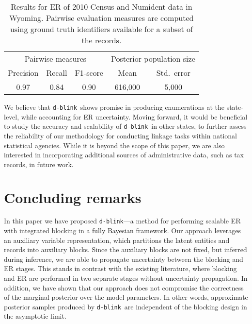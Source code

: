 \documentclass[12pt,letterpaper]{article}
\newcommand{\1}[1]{\mathbb{I}\!\left[#1\right]} %
\newcommand{\dblink}{\texttt{\upshape \lowercase{d-blink}}} %
\begin{document}
\begin{table}
  \centering
  \caption{Results for ER of 2010 Census and Numident data in Wyoming. 
  Pairwise evaluation measures are computed using ground truth identifiers 
  available for a subset of the records.}
  \label{tbl:census-results}
  \footnotesize
  \begin{center}
  \begin{tabular}{*{3}{c} *{2}{c}}
    \toprule
    \multicolumn{3}{c}{Pairwise measures} & \multicolumn{2}{c}{Posterior population size} \\
    \cmidrule(lr){1-3} \cmidrule(lr){4-5}
    Precision & Recall & F1-score &    Mean & Std.~error \\
    \midrule
    0.97 &   0.84 &     0.90 & 616,000 & 5,000 \\
    \bottomrule
  \end{tabular}
  \end{center}
\end{table}

We believe that \dblink\ shows promise in producing enumerations at the 
state-level, while accounting for ER uncertainty.
Moving forward, it would be beneficial to study the accuracy and scalability 
of \dblink\ in other states, to further assess the reliability of our 
methodology for conducting linkage tasks within national statistical 
agencies. 
While it is beyond the scope of this paper, we are also interested in 
incorporating additional sources of administrative data, such as tax records, 
in future work.

\section{Concluding remarks}
\label{sec:conclusions}
In this paper we have proposed \dblink---a method for performing scalable 
ER with integrated blocking in a fully Bayesian framework. 
Our approach leverages an auxiliary variable representation, which 
partitions the latent entities and records into auxiliary blocks. 
Since the auxiliary blocks are not fixed, but inferred during inference, 
we are able to propagate uncertainty between the blocking and ER stages. 
This stands in contrast with the existing literature, where blocking 
and ER are performed in two separate stages without uncertainty 
propagation. 
In addition, we have shown that our approach does not compromise 
the correctness of the marginal posterior over the model parameters. 
In other words, approximate posterior samples produced by \dblink\ 
are independent of the blocking design in the asymptotic limit.
\end{document}
